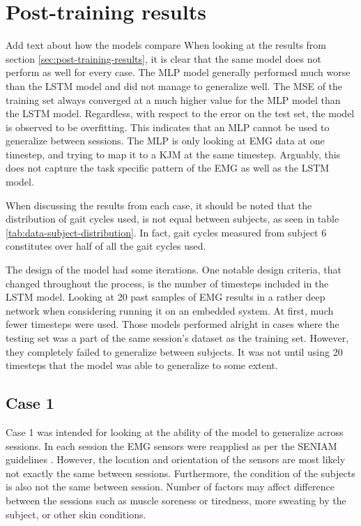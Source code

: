 \documentclass[../main.tex]{subfiles}
\begin{document}
\section{Post-training results}
\label{sec:discussion_post-training-results}
Add text about how the models compare
When looking at the results from section \ref{sec:post-training-results}, it is clear that the same model does not perform as well for every case.
The \ac{MLP} model generally performed much worse than the \ac{LSTM} model and did not manage to generalize well.
The \ac{MSE} of the training set always converged at a much higher value for the \ac{MLP} model than the \ac{LSTM} model.
Regardless, with respect to the error on the test set, the model is observed to be overfitting.
This indicates that an \ac{MLP} cannot be used to generalize between sessions.
The \ac{MLP} is only looking at \ac{EMG} data at one timestep, and trying to map it to a \ac{KJM} at the same timestep.
Arguably, this does not capture the task specific pattern of the \ac{EMG} as well as the \ac{LSTM} model.

When discussing the results from each case, it should be noted that the distribution of gait cycles used, is not equal between subjects, as seen in table \ref{tab:data-subject-distribution}. 
In fact, gait cycles measured from subject 6 constitutes over half of all the gait cycles used.


The design of the model had some iterations. 
One notable design criteria, that changed throughout the process, is the number of timesteps included in the \ac{LSTM} model.
Looking at 20 past samples of \ac{EMG} results in a rather deep network when considering running it on an embedded system.
At first, much fewer timesteps were used.
Those models performed alright in cases where the testing set was a part of the same session's dataset as the training set.
However, they completely failed to generalize between subjects.
It was not until using 20 timesteps that the model was able to generalize to some extent.

\subsection{Case 1}
\label{sec:discussion-case1}
Case 1 was intended for looking at the ability of the model to generalize across sessions.
In each session the \ac{EMG} sensors were reapplied as per the \ac{SENIAM} guidelines \cite{Hermens1999, Hermens2000}.
However, the location and orientation of the sensors are most likely not exactly the same between sessions.
Furthermore, the condition of the subjects is also not the same between session.
Number of factors may affect difference between the sessions such as muscle soreness or tiredness, more sweating by the subject, or other skin conditions.
\end{document}
